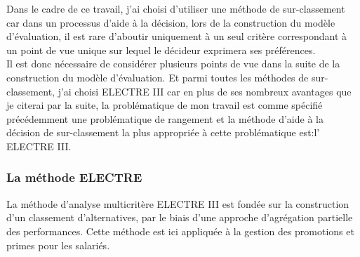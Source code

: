 Dans le cadre de ce travail, j’ai choisi d’utiliser une méthode de sur-classement car dans un processus d’aide à la décision, lors de la construction du modèle d’évaluation, il est rare d’aboutir uniquement à un seul critère correspondant à un point de vue unique sur lequel  le décideur exprimera ses préférences.\\ 
Il est donc nécessaire de considérer plusieurs points de vue dans la suite de la construction du modèle d’évaluation. Et parmi toutes les méthodes de sur-classement, j’ai choisi ELECTRE III car en plus de ses nombreux avantages que je citerai par la suite, la problématique de mon travail est comme spécifié précédemment une problématique de rangement et la méthode d’aide à la décision de sur-classement la plus appropriée à cette problématique est:l' ELECTRE III.

\subsubsection{La méthode ELECTRE}
La méthode d’analyse multicritère ELECTRE III est fondée sur la construction d’un classement d’alternatives, par le biais d’une approche d’agrégation partielle des performances. Cette méthode est ici appliquée à la gestion des promotions et primes pour les salariés.

